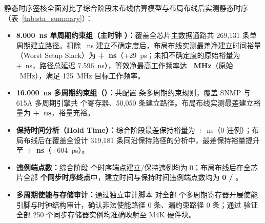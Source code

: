 静态时序签核全面对比了综合阶段未布线估算模型与布局布线后实测静态时序（表~\ref{tab:sta_summary}）：
\begin{itemize}
  \item \textbf{8.000~ns 单周期约束组（主时钟 ）：}覆盖全芯片主数据通路共 269,131 条单周期建立路径。扣除 \ClkUncert~ns 建立不确定度后，布局布线实测最差净建立时间裕量（Worst Setup Slack）为 \textbf{+\RoutedSetup~ns}（+29~ps；未扣不确定度的原始裕量为 +\RoutedSetupRaw~ns，路径总延迟 7.596~ns），等效净最高工作频率达 \textbf{\RoutedFmax~MHz}（原始 \RoutedFmaxRaw~MHz），满足 125~MHz 目标工作频率。
  \item \textbf{16.000~ns 多周期约束组（）：}共配置 \MulticycleRules{} 条多周期约束规则，覆盖 SNMP 与 615A 多周期引擎共 \countsep{\MulticycleRegs} 个寄存器、50,050 条建立路径。布局布线实测最差建立裕量为 \textbf{+\MulticycleSetup~ns}，裕量充裕。
  \item \textbf{保持时间分析（Hold Time）：}综合阶段最差保持裕量为 +\Hold~ns（0 违例）；布局布线后在覆盖全设计 319,181 条同沿保持路径的分析中，最差保持裕量提升至 \textbf{+\RoutedHold~ns}（+604~ps）。
  \item \textbf{违例端点数：}综合阶段 \countsep{\SynthEndpoints} 个时序端点建立/保持违例均为 0；布局布线后在全芯片全部 \textbf{\countsep{\RoutedEndpoints} 个同步时序终点}中，建立时间与保持时间违例端点数均为 \textbf{0 / \countsep{\RoutedEndpoints}}。
  \item \textbf{多周期使能与存储审计：}通过独立审计脚本  对全部 \countsep{\MulticycleRegs} 个多周期寄存器开展使能引脚与时钟结构审计，确认非法使能路径 0 条、漏约束路径 0 条；通过  验证全部 250 个同步存储器实例均准确映射至 M4K 硬件块。
\end{itemize}

